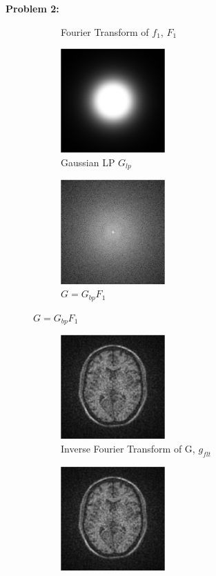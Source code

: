 \documentclass[11pt]{article}
\newenvironment{problem}[1]{\textbf{Problem #1: }}{\newpage}
\begin{document}
\begin{problem}{2}
\begin{enumerate}[label = (\alph*)]
\begin{figure}[h!]
\begin{subfigure}[h!]{.3\textwidth}
					\caption{Fourier Transform of $f_1$, $F_1$}
				\end{subfigure}
				\begin{subfigure}[h!]{.3\textwidth}
					\centering
					\includegraphics[height = 4cm]{Figures/Prob2/5}
					\caption{Gaussian LP $G_{lp}$}
				\end{subfigure}
				\begin{subfigure}[h!]{.3\textwidth}
					\centering
					\includegraphics[height = 4cm]{Figures/Prob2/6}
					\caption{$G = G_{bp}F_1$}
				\end{subfigure}
			\end{figure}
			\begin{figure}[h!]
				\centering
				\begin{subfigure}[h!]{.4\textwidth}
					\centering
					\includegraphics[height = 4cm]{Figures/Prob2/7}
					\caption{Inverse Fourier Transform of G, $g_{flt}$}
				\end{subfigure}
				\begin{subfigure}[h!]{.4\textwidth}
					\centering
					\includegraphics[height = 4cm]{Figures/Prob2/8}

\end{subfigure}
\end{figure}
\end{enumerate}
\end{problem}
\end{document}
